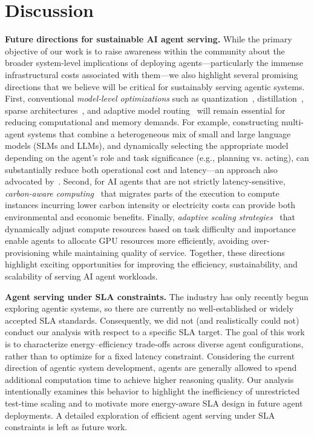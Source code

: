 \section{Discussion}
\label{sect:discussion}

\setlength{\fboxsep}{1.2pt}
\textbf{Future directions for sustainable AI agent serving.}
While the primary objective of our work is to raise awareness within the community about the broader system-level implications of deploying agents—particularly the immense infrastructural costs associated with them—we also highlight several promising directions that we believe will be critical for sustainably serving agentic systems.
First, conventional \textit{model-level optimizations} such as quantization~\cite{lin2024awq,xiao2023smoothquant,frantar2022gptq}, distillation~\cite{hinton2015distilling,muralidharan2024compact,sreenivas2024llm,guo2025deepseek}, sparse architectures~\cite{fedus2022switch,yuan2025native,liang2024mixture}, and adaptive model routing~\cite{panda2025adaptive,ding2025best} will remain essential for reducing computational and memory demands. For example, constructing multi-agent systems that combine a heterogeneous mix of small and large language models (SLMs and LLMs), and dynamically selecting the appropriate model depending on the agent’s role and task significance (e.g., planning vs. acting), can substantially reduce both operational cost and latency—an approach also advocated by~\cite{belcak2025small}.
Second, for AI agents that are not strictly latency-sensitive, \textit{carbon-aware computing}~\cite{radovanovic2022carbon,li2023clover,gsteiger2024caribou} that migrates parts of the execution to compute instances incurring lower carbon intensity or electricity costs can provide both environmental and economic benefits.
Finally, \textit{adaptive scaling strategies}~\cite{snell2024scaling,qu2025optimizing,yang2025towards} that dynamically adjust compute resources based on task difficulty and importance enable agents to allocate GPU resources more efficiently, avoiding over-provisioning while maintaining quality of service.
Together, these directions highlight exciting opportunities for improving the efficiency, sustainability, and scalability of serving AI agent workloads.


\textbf{Agent serving under SLA constraints.}
The industry has only recently begun exploring agentic systems, so there are currently no well-established or widely accepted SLA standards. Consequently, we did not (and realistically could not) conduct our analysis with respect to a specific SLA target. The goal of this work is to characterize energy–efficiency trade-offs across diverse agent configurations, rather than to optimize for a fixed latency constraint. Considering the current direction of agentic system development, agents are generally allowed to spend additional computation time to achieve higher reasoning quality. Our analysis intentionally examines this behavior to highlight the inefficiency of unrestricted test-time scaling and to motivate more energy-aware SLA design in future agent deployments. A detailed exploration of efficient agent serving under SLA constraints is left as future work.

